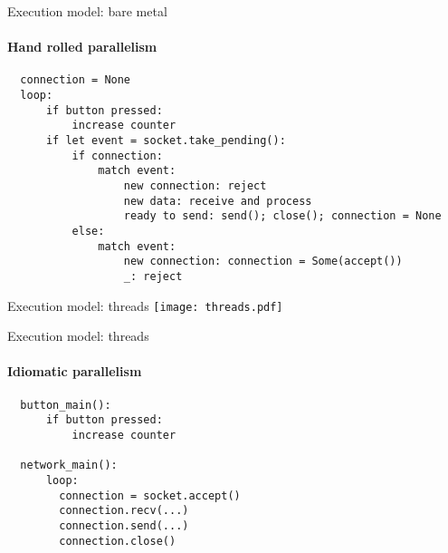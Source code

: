 \documentclass[aspectratio=169]{beamer}
\begin{document}
\begin{frame}[fragile]{Execution model: bare metal}
\framesubtitle{Hand rolled parallelism}
  \begin{verbatim}
  connection = None
  loop:
      if button pressed:
          increase counter
      if let event = socket.take_pending():
          if connection:
              match event:
                  new connection: reject
                  new data: receive and process
                  ready to send: send(); close(); connection = None
          else:
              match event:
                  new connection: connection = Some(accept())
                  _: reject
  \end{verbatim}
\end{frame}

\begin{frame}{Execution model: threads}\Large
  \center
  \vspace{-1em}
  \texttt{[image: threads.pdf]}
\end{frame}

\begin{frame}[fragile]{Execution model: threads}
\framesubtitle{Idiomatic parallelism}
  \begin{verbatim}
  button_main():
      if button pressed:
          increase counter

  network_main():
      loop:
        connection = socket.accept()
        connection.recv(...)
        connection.send(...)
        connection.close()
  \end{verbatim}
\end{frame}
\end{document}
